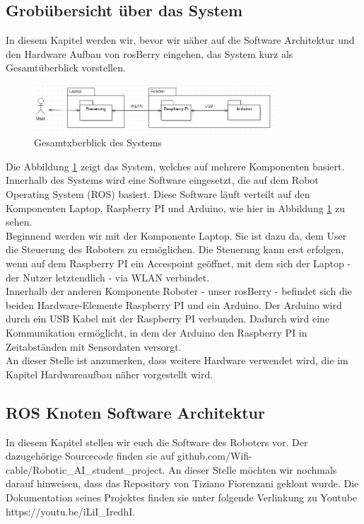 \documentclass[conference]{IEEEtran}
\begin{document}
	\subsection{Grobübersicht über das System}
	In diesem Kapitel werden wir, bevor wir näher auf die Software Architektur und den Hardware Aufbau von rosBerry eingehen, das System kurz als Gesamtüberblick vorstellen.
	
	\begin{figure}[!ht]
	\centering
	\includegraphics[width=9cm]{img/Gesamtsystem.PNG}
	\caption{Gesamtxberblick des Systems}
	\label{Gesamt zusammenhang}
	\end{figure}
	Die Abbildung \ref{Gesamt zusammenhang} zeigt das System, welches auf mehrere Komponenten basiert. Innerhalb des Systems wird eine Software eingesetzt, die auf dem Robot Operating System (ROS) basiert. Diese Software läuft verteilt auf den Komponenten Laptop, Raspberry PI und Arduino, wie hier in Abbildung \ref{Gesamt zusammenhang} zu sehen. \\
	
	Beginnend werden wir mit der Komponente Laptop. Sie ist dazu da, dem User die Steuerung des Roboters zu ermöglichen. Die Steuerung kann erst erfolgen, wenn auf dem Raspberry PI ein Accespoint geöffnet, mit dem sich der Laptop - der Nutzer letztendlich - via WLAN verbindet.\\
	Innerhalb der anderen Komponente Roboter - unser rosBerry - befindet sich die beiden Hardware-Elemente Raspberry PI und ein Arduino. Der Arduino wird durch ein USB Kabel mit der Raspberry PI verbunden. Dadurch wird eine Kommunikation ermöglicht, in dem der Arduino den Raspberry PI in Zeitabständen mit Sensordaten versorgt.\\
	An dieser Stelle ist anzumerken, dass weitere Hardware verwendet wird, die im Kapitel Hardwareaufbau näher vorgestellt wird.
	
	\subsection{ROS Knoten Software Architektur}%
	In diesem Kapitel stellen wir euch die Software des Roboters vor. Der dazugehörige Sourcecode finden sie auf github.com/Wifi-cable/Robotic\_AI\_student\_project. An dieser Stelle möchten wir nochmals darauf hinweisen, dass das Repository von Tiziano Fiorenzani geklont wurde. Die Dokumentation seines Projektes finden sie unter folgende Verlinkung zu Youtube https://youtu.be/iLiI\_IredhI.
	
\end{document}
